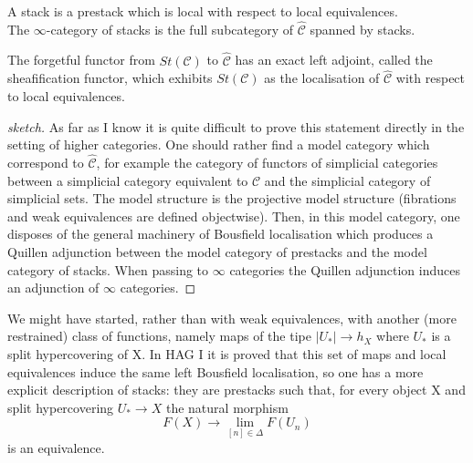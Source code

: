 \begin{refsection}
\begin{rmk}
\end{rmk}

\begin{defin}
A stack is a prestack which is local with respect to local equivalences.\\
The $\infty$-category of stacks is the full subcategory of $\hat{\mathcal C}$ spanned by stacks. 
\end{defin}

\begin{prop}[{\cite{tv}}]
The forgetful functor from $St(\mathcal C)$ to $\hat{\mathcal C}$ has an exact left adjoint, called the sheafification functor, which exhibits $St(\mathcal C)$ as the localisation of $\hat{\mathcal C}$
with respect to local equivalences. 
\end{prop}

\begin{proof} [sketch]
As far as I know it is quite difficult to prove this statement directly in the setting of higher categories. One should rather find a model category which correspond to
$\hat{\mathcal C}$, for example the category of functors of simplicial categories between a simplicial category equivalent to $\mathcal C$ and the simplicial category of simplicial sets.
The model structure is the projective model structure (fibrations and weak equivalences are defined objectwise). Then, in this model category, one disposes of the general
machinery of Bousfield localisation which produces a Quillen adjunction between the model category of prestacks and the model category of stacks. When passing to $\infty$
categories the Quillen adjunction induces an adjunction of $\infty$
categories.
\end{proof}

\begin{prop}
We might have started, rather than with weak equivalences, with another (more restrained) class of functions, namely maps of the tipe $|U_*|\to h_X$ where $U_*$ is a split
hypercovering of X. In HAG I it is proved that this set of maps and local equivalences induce the same left Bousfield localisation, so one has a more explicit description
of stacks: they are prestacks such that, for every object X and split hypercovering $U_*\to X$ the natural morphism
$$F(X)\to\lim_{[n]\in\Delta} F(U_n)$$
is an equivalence.
\end{prop}


\end{refsection}
